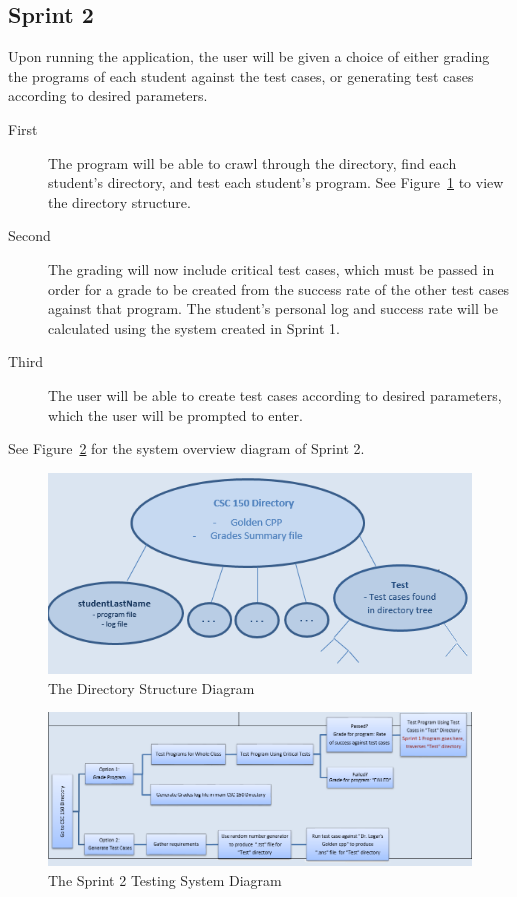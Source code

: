 \subsection{Sprint 2}
Upon running the application, the user will be given a choice of either grading the programs of each student against the test cases, or generating test cases according to desired parameters.
\begin{description}
\item[First      ]The program will be able to crawl through the directory, find each student's directory, and test each student's program. See Figure~\ref{DirectoryTree} to view the directory structure.
\item[Second]The grading will now include critical test cases, which must be passed in order for a grade to be created from the success rate of the other test cases against that program.  The student's personal log and success rate will be calculated using the system created in Sprint 1. 
\item[Third   ]The user will be able to create test cases according to desired parameters, which the user will be prompted to enter.
\end{description}  
See Figure~\ref{systemdiagram2} for the system overview diagram of Sprint 2.

\begin{figure}[H]
\begin{center}
\includegraphics[width=.7\textwidth]{./DirectoryTree}
\end{center}
\caption{The Directory Structure Diagram \label{DirectoryTree}}
\end{figure}

\begin{figure}[H]
\begin{center}
\includegraphics[width=1.1\textwidth]{./diagram2}
\end{center}
\caption{The Sprint 2 Testing System Diagram \label{systemdiagram2}}
\end{figure}

